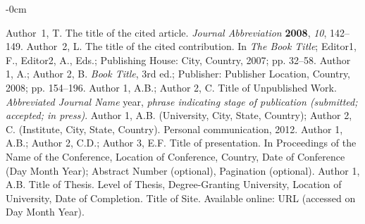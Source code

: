 \documentclass[article,submit,moreauthors,pdftex]{Definitions/mdpi}
\begin{document}
	\begin{adjustwidth}{-\extralength}{0cm}
		
		
		
		
		\begin{thebibliography}{999}
			Author~1, T. The title of the cited article. {\em Journal Abbreviation} {\bf 2008}, {\em 10}, 142--149.
			Author~2, L. The title of the cited contribution. In {\em The Book Title}; Editor1, F., Editor2, A., Eds.; Publishing House: City, Country, 2007; pp. 32--58.
			Author 1, A.; Author 2, B. \textit{Book Title}, 3rd ed.; Publisher: Publisher Location, Country, 2008; pp. 154--196.
			Author 1, A.B.; Author 2, C. Title of Unpublished Work. \textit{Abbreviated Journal Name} year, \textit{phrase indicating stage of publication (submitted; accepted; in press)}.
			Author 1, A.B. (University, City, State, Country); Author 2, C. (Institute, City, State, Country). Personal communication, 2012.
			Author 1, A.B.; Author 2, C.D.; Author 3, E.F. Title of presentation. In Proceedings of the Name of the Conference, Location of Conference, Country, Date of Conference (Day Month Year); Abstract Number (optional), Pagination (optional).
			Author 1, A.B. Title of Thesis. Level of Thesis, Degree-Granting University, Location of University, Date of Completion.
			Title of Site. Available online: URL (accessed on Day Month Year).
		\end{thebibliography}
	\end{adjustwidth}
\end{document}
